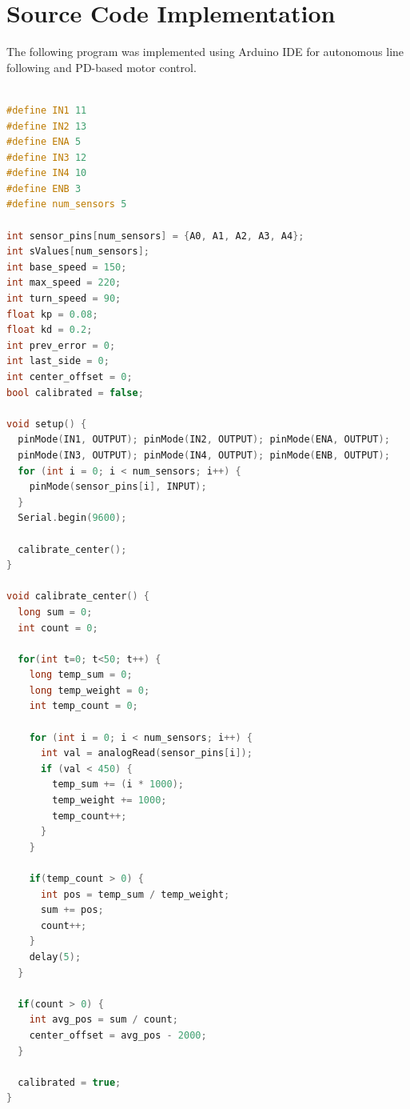 \documentclass[12pt,a4paper,oneside]{report}
\begin{document}


\section{Source Code Implementation}

The following program was implemented using Arduino IDE for autonomous line following and PD-based motor control.

\begin{lstlisting}[language=C++, caption={Arduino Source Code for Autonomous Food Delivery Robot}]

#define IN1 11
#define IN2 13
#define ENA 5
#define IN3 12
#define IN4 10
#define ENB 3
#define num_sensors 5

int sensor_pins[num_sensors] = {A0, A1, A2, A3, A4};
int sValues[num_sensors];
int base_speed = 150;
int max_speed = 220;
int turn_speed = 90;
float kp = 0.08;
float kd = 0.2;
int prev_error = 0;
int last_side = 0;
int center_offset = 0;
bool calibrated = false;

void setup() {
  pinMode(IN1, OUTPUT); pinMode(IN2, OUTPUT); pinMode(ENA, OUTPUT);
  pinMode(IN3, OUTPUT); pinMode(IN4, OUTPUT); pinMode(ENB, OUTPUT);
  for (int i = 0; i < num_sensors; i++) {
    pinMode(sensor_pins[i], INPUT);
  }
  Serial.begin(9600);
  
  calibrate_center();
}

void calibrate_center() {
  long sum = 0;
  int count = 0;
  
  for(int t=0; t<50; t++) {
    long temp_sum = 0;
    long temp_weight = 0;
    int temp_count = 0;
    
    for (int i = 0; i < num_sensors; i++) {
      int val = analogRead(sensor_pins[i]);
      if (val < 450) {
        temp_sum += (i * 1000);
        temp_weight += 1000;
        temp_count++;
      }
    }
    
    if(temp_count > 0) {
      int pos = temp_sum / temp_weight;
      sum += pos;
      count++;
    }
    delay(5);
  }
  
  if(count > 0) {
    int avg_pos = sum / count;
    center_offset = avg_pos - 2000;
  }
  
  calibrated = true;
}


\end{lstlisting}
\end{document}
